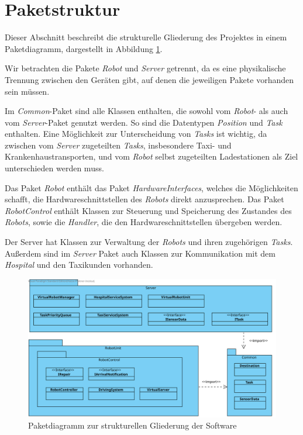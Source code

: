 \section{Paketstruktur}
Dieser Abschnitt beschreibt die strukturelle Gliederung des Projektes in einem Paketdiagramm, dargestellt in Abbildung \ref{Paketstruktur}.

Wir betrachten die Pakete \textit{Robot} und \textit{Server} getrennt, da es eine physikalische Trennung zwischen den Geräten gibt, auf denen die jeweiligen Pakete vorhanden sein müssen.

Im \textit{Common}-Paket sind alle Klassen enthalten, die sowohl vom \textit{Robot}- als auch vom \textit{Server}-Paket genutzt werden. 
So sind die Datentypen \textit{Position} und \textit{Task} enthalten. 
Eine Möglichkeit zur Unterscheidung von \textit{Tasks} ist wichtig, da zwischen vom \textit{Server} zugeteilten \textit{Tasks}, insbesondere Taxi- und Krankenhaustransporten, und vom \textit{Robot} selbst zugeteilten Ladestationen als Ziel unterschieden werden muss. 

Das Paket \textit{Robot} enthält das Paket \textit{HardwareInterfaces}, welches die Möglichkeiten schafft, die Hardwareschnittstellen des \textit{Robots} direkt anzusprechen. 
Das Paket \textit{RobotControl} enthält Klassen zur Steuerung und Speicherung des Zustandes des \textit{Robots}, sowie die \emph{Handler}, die den Hardwareschnittstellen übergeben werden.

Der Server hat Klassen zur Verwaltung der \textit{Robots} und ihren zugehörigen \textit{Tasks}. 
Außerdem sind im \textit{Server} Paket auch Klassen zur Kommunikation mit dem \textit{Hospital} und den Taxikunden vorhanden.

\begin{figure}[H]
\centering
\includegraphics[height=0.85\textwidth, angle=90]{img/6_paketdiagramm}
\caption{Paketdiagramm zur strukturellen Gliederung der Software}
\label{Paketstruktur}
\end{figure}